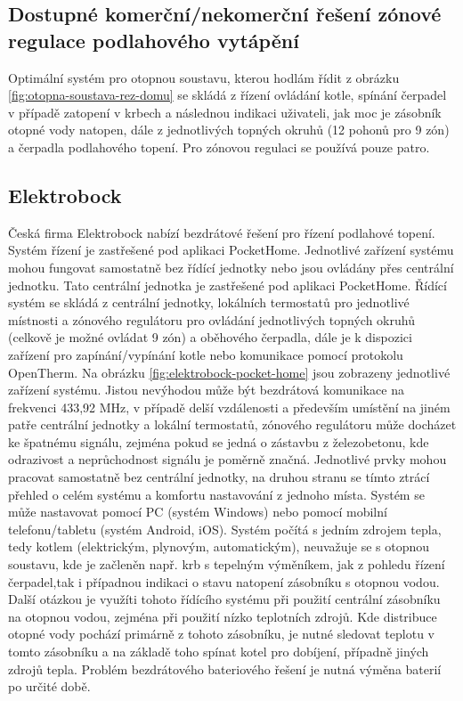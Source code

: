 \subsection{Dostupné komerční/nekomerční řešení zónové regulace podlahového vytápění}

Optimální systém pro otopnou soustavu, kterou hodlám řídit z obrázku \ref{fig:otopna-soustava-rez-domu} se skládá z řízení ovládání kotle, spínání čerpadel v případě zatopení v krbech a následnou indikaci uživateli, jak moc je zásobník otopné vody natopen, dále z jednotlivých topných okruhů (12 pohonů pro 9 zón) a čerpadla podlahového topení. Pro zónovou regulaci se používá pouze patro.

\subsection{Elektrobock}
Česká firma Elektrobock nabízí bezdrátové řešení pro řízení podlahové topení.  Systém řízení je zastřešené pod aplikaci PocketHome. Jednotlivé zařízení systému mohou fungovat samostatně bez řídící jednotky nebo jsou ovládány přes centrální jednotku. Tato centrální jednotka je zastřešené pod aplikaci PocketHome. Řídící systém se skládá z centrální jednotky, lokálních termostatů pro jednotlivé místnosti a zónového regulátoru pro ovládání jednotlivých topných okruhů (celkově je možné ovládat 9 zón) a oběhového čerpadla, dále je k dispozici zařízení pro zapínání/vypínání kotle nebo komunikace pomocí protokolu OpenTherm. Na obrázku \ref{fig:elektrobock-pocket-home} jsou zobrazeny jednotlivé zařízení systému. Jistou nevýhodou může být bezdrátová komunikace na frekvenci 433,92 MHz, v případě delší vzdálenosti a především umístění na jiném patře centrální jednotky a lokální termostatů, zónového regulátoru může docházet ke špatnému signálu, zejména pokud se jedná o zástavbu z železobetonu, kde odrazivost a neprůchodnost signálu je poměrně značná. Jednotlivé prvky mohou pracovat samostatně bez centrální jednotky, na druhou stranu se tímto ztrácí přehled o celém systému a komfortu nastavování z jednoho místa. Systém se může nastavovat pomocí PC (systém Windows) nebo pomocí mobilní telefonu/tabletu (systém Android, iOS). Systém počítá s jedním zdrojem tepla, tedy kotlem (elektrickým, plynovým, automatickým), neuvažuje se s otopnou soustavu, kde je začleněn např. krb s tepelným výměníkem, jak z pohledu řízení čerpadel,tak i případnou indikaci o stavu natopení zásobníku s otopnou vodou. Další otázkou je využíti tohoto řídícího systému při použití centrální zásobníku na otopnou vodou, zejména při použití nízko teplotních zdrojů. Kde distribuce otopné vody pochází primárně z tohoto zásobníku, je nutné sledovat teplotu v tomto zásobníku a na základě toho spínat kotel pro dobíjení, případně jiných zdrojů tepla. Problém bezdrátového bateriového řešení je nutná výměna baterií po určité době.


